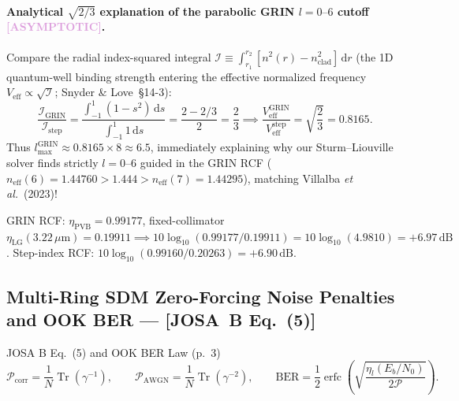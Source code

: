 \documentclass[10pt,letterpaper]{article}
\newcommand{\dd}{\mathrm{d}}
\newcommand{\josb}[1]{\textbf{[JOSA~B Eq.~(#1)]}}
\newcommand{\tagasymp}{\textcolor{plum}{\textbf{[ASYMPTOTIC]}}}
\numberwithin{equation}{section}
\begin{document}
\paragraph*{Analytical $\sqrt{2/3}$ explanation of the parabolic GRIN $l = 0\text{--}6$ cutoff \tagasymp{}.}
Compare the radial index-squared integral $\mathcal{I} \equiv \int_{r_1}^{r_2} [n^2(r) - n_{\mathrm{clad}}^2]\,\dd r$ (the 1D quantum-well binding strength entering the effective normalized frequency $V_{\mathrm{eff}} \propto \sqrt{\mathcal{I}}$; Snyder \& Love~\S14-3):
\begin{equation}
  \frac{\mathcal{I}_{\mathrm{GRIN}}}{\mathcal{I}_{\mathrm{step}}} = \frac{\int_{-1}^{1}(1 - s^2)\,\dd s}{\int_{-1}^{1} 1\,\dd s} = \frac{2 - 2/3}{2} = \frac{2}{3} \implies \frac{V_{\mathrm{eff}}^{\mathrm{GRIN}}}{V_{\mathrm{eff}}^{\mathrm{step}}} = \sqrt{\frac{2}{3}} = 0.8165.
\end{equation}
Thus $l_{\max}^{\mathrm{GRIN}} \approx 0.8165 \times 8 \approx 6.5$, immediately explaining why our Sturm--Liouville solver finds strictly $l = 0\text{--}6$ guided in the GRIN RCF ($n_{\mathrm{eff}}(6) = 1.44760 > 1.444 > n_{\mathrm{eff}}(7) = 1.44295$), matching Villalba \emph{et al.}~(2023)!

\begin{pencheck}[Hand Check of Decibel Coupling Gain at $l = 4$ (Table~1)]
GRIN RCF: $\eta_{\mathrm{PVB}} = 0.99177$, fixed-collimator $\eta_{\mathrm{LG}}(3.22\,\mu\mathrm{m}) = 0.19911 \implies 10\log_{10}(0.99177/0.19911) = 10\log_{10}(4.9810) = \mathbf{+6.97\,\mathrm{dB}}$. Step-index RCF: $10\log_{10}(0.99160/0.20263) = \mathbf{+6.90\,\mathrm{dB}}$.
\end{pencheck}

\subsection{Multi-Ring SDM Zero-Forcing Noise Penalties and OOK BER --- \josb{5}}

\begin{targeteq}{JOSA B Eq.~(5) and OOK BER Law (p.~3)}
\[
  \mathcal{P}_{\mathrm{corr}} = \frac{1}{N}\operatorname{Tr}(\gamma^{-1}), \qquad \mathcal{P}_{\mathrm{AWGN}} = \frac{1}{N}\operatorname{Tr}(\gamma^{-2}), \qquad \mathrm{BER} = \frac{1}{2}\operatorname{erfc}\!\left(\sqrt{\frac{\eta_l(E_b/N_0)}{2\mathcal{P}}}\right).
\]
\end{targeteq}
\end{document}
